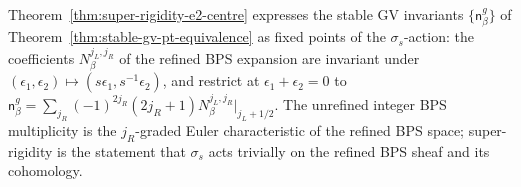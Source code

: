\begin{remark}
\label{rem:super-rigidity-reads-stable-gv}
Theorem~\ref{thm:super-rigidity-e2-centre} expresses the stable GV
invariants $\{\mathsf{n}^{g}_\beta\}$ of
Theorem~\ref{thm:stable-gv-pt-equivalence} as fixed points of the
$\sigma_s$-action: the coefficients $N^{j_L, j_R}_\beta$ of the
refined BPS expansion are invariant under $(\epsilon_1, \epsilon_2)
\mapsto (s\epsilon_1, s^{-1}\epsilon_2)$, and restrict at $\epsilon_1
+ \epsilon_2 = 0$ to $\mathsf{n}^{g}_\beta = \sum_{j_R} (-1)^{2j_R}
(2j_R + 1) N^{j_L, j_R}_\beta|_{j_L + 1/2}$. The unrefined integer
BPS multiplicity is the $j_R$-graded Euler characteristic of the
refined BPS space; super-rigidity is the statement that $\sigma_s$
acts trivially on the refined BPS sheaf and its cohomology.
\end{remark}


